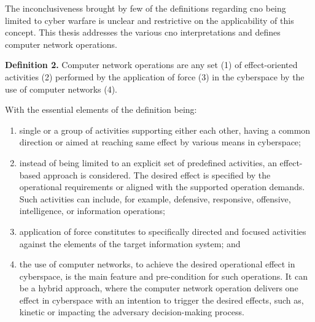 The inconclusiveness brought by few of the definitions regarding \gls{cno} being limited to cyber warfare is unclear and restrictive on the applicability of this concept.
This thesis addresses the various \gls{cno} interpretations and defines computer network operations.
\begin{description}
    \label{def:cno}
    \item \textbf{Definition 2.} Computer network operations are any set (1) of effect-oriented activities (2) performed by the application of force (3) in the cyberspace by the use of computer networks (4).

    With the essential elements of the definition being:
    \begin{enumerate}
        \item single or a group of activities supporting either each other, having a common direction or aimed at reaching same effect by various means in cyberspace;
        \item instead of being limited to an explicit set of predefined activities, an effect-based approach is considered. The desired effect is specified by the operational requirements or aligned with the supported operation demands. Such activities can include, for example, defensive, responsive, offensive, intelligence, or information operations;
        \item application of force constitutes to specifically directed and focused activities against the elements of the target information system; and
        \item the use of computer networks, to achieve the desired operational effect in cyberspace, is the main feature and pre-condition for such operations. It can be a hybrid approach, where the computer network operation delivers one effect in cyberspace with an intention to trigger the desired effects, such as, kinetic or impacting the adversary decision-making process.
    \end{enumerate}
\end{description}

